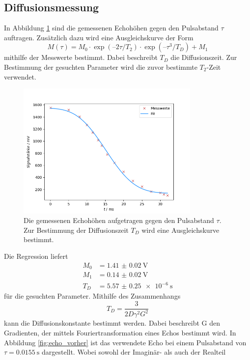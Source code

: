 \subsection{Diffusionsmessung}
In Abbildung \ref{fig:diff_fit} sind die gemessenen Echohöhen gegen den Pulsabstand $\tau$ auftragen.
Zusätzlich dazu wird eine Ausgleichskurve der Form
\begin{equation}
  M(\tau) = M_0 \cdot \exp(–2\tau/T_2)\cdot \exp(–\tau^3/T_D) + M_1 
\end{equation}
mithilfe der Messwerte bestimmt. Dabei beschreibt $T_D$ die Diffusionszeit. Zur Bestimmung der gesuchten Parameter wird 
die zuvor bestimmte $T_2$-Zeit verwendet.
\begin{figure}[H]
  \centering
  \includegraphics[width=0.8\textwidth]{../Auswertung/Diff_fit.png}
  \caption{Die gemessenen Echohöhen aufgetragen gegen den Pulsabstand $\tau$. Zur Bestimmung der Diffusionszeit $T_D$ wird eine
  Ausgleichskurve bestimmt.}
  \label{fig:diff_fit}
\end{figure} \noindent
Die Regression liefert
\begin{align}
  M_0 &= \SI{1.41(002)}{\volt} \\
  M_1 &= \SI{0.14(002)}{\volt} \\
  T_D &= \SI{5.57(025)e-6}{\second}
\end{align}
für die gesuchten Parameter.
Mithilfe des Zusammenhangs
\begin{equation}
  T_D = \frac{3}{2D\gamma^2 G^2}
\label{eqn:D}
\end{equation}
kann die Diffusionskonstante bestimmt werden. Dabei beschreibt G den Gradienten, der mittels Fouriertransformation eines Echos
bestimmt wird. In Abbildung \ref{fig:echo_vorher} ist das verwendete Echo bei einem Pulsabstand von $\tau = \SI{0.0155}{\second}$ dargestellt. Wobei sowohl der Imaginär- als auch der Realteil

